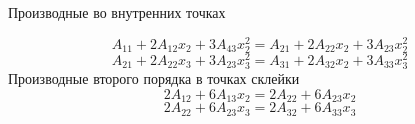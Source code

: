 \documentclass[russian,utf8,nocolumnxxxi,nocolumnxxxii]{eskdtext}
\begin{document}
Производные во внутренних точках

\begin{equation}
A_{11} + 2A_{12}x_2 + 3A_{43}x^2_2=A_{21} + 2A_{22}x_2 + 3A_{23}x^2_2
\end{equation}
\begin{equation}
A_{21} + 2A_{22}x_3 + 3A_{23}x^2_3= A_{31} + 2A_{32}x_2 + 3A_{33}x^2_3
\end{equation}
Производные второго порядка в точках склейки
\begin{equation}
2A_{12} + 6A_{13}x_2=2A_{22} + 6A_{23}x_2
\end{equation}
\begin{equation}
2A_{22} + 6A_{23}x_3= 2A_{32} + 6A_{33}x_3
\end{equation}
\end{document}
